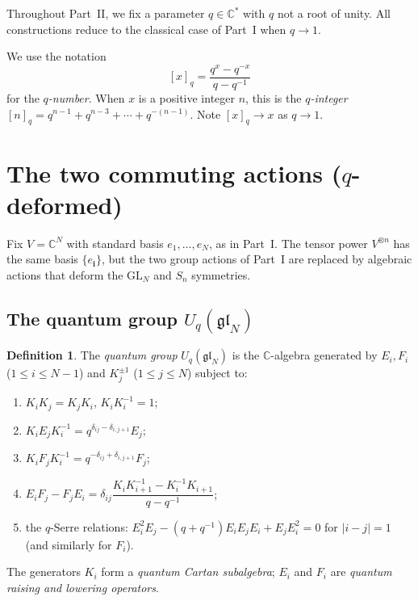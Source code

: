 \documentclass[12pt,a4paper]{article}
\theoremstyle{definition}
\newtheorem{definition}[theorem]{Definition}
\theoremstyle{remark}
\newcommand{\C}{\mathbb{C}}
\newcommand{\gl}{\mathfrak{gl}}
\begin{document}
Throughout Part~II, we fix a parameter $q \in \C^*$ with $q$ not a
root of unity. All constructions reduce to the classical case of
Part~I when $q \to 1$.

We use the notation
\[
  [x]_q = \frac{q^x - q^{-x}}{q - q^{-1}}
\]
for the \emph{$q$-number}. When $x$ is a positive integer $n$, this
is the \emph{$q$-integer} $[n]_q = q^{n-1} + q^{n-3} + \cdots +
q^{-(n-1)}$. Note $[x]_q \to x$ as $q \to 1$.

\section{The two commuting actions ($q$-deformed)}
\label{sec:q-setup}

Fix $V = \C^N$ with standard basis $e_1, \ldots, e_N$, as in Part~I.
The tensor power $V^{\otimes n}$ has the same basis $\{e_\mathbf{i}\}$,
but the two group actions of Part~I are replaced by algebraic actions
that deform the $\mathrm{GL}_N$ and $S_n$ symmetries.

\subsection{The quantum group $U_q(\gl_N)$}

\begin{definition}
The \emph{quantum group} $U_q(\gl_N)$ is the $\C$-algebra generated by
$E_i, F_i$ ($1 \leqslant i \leqslant N{-}1$) and $K_j^{\pm 1}$
($1 \leqslant j \leqslant N$) subject to:
\begin{enumerate}[label=(\roman*)]
\item $K_i K_j = K_j K_i$, \; $K_i K_i^{-1} = 1$;
\item $K_i E_j K_i^{-1} = q^{\delta_{ij} - \delta_{i,j+1}} E_j$;
\item $K_i F_j K_i^{-1} = q^{-\delta_{ij} + \delta_{i,j+1}} F_j$;
\item $E_i F_j - F_j E_i = \delta_{ij}
  \dfrac{K_i K_{i+1}^{-1} - K_i^{-1} K_{i+1}}{q - q^{-1}}$;
\item the $q$-Serre relations:
  $E_i^2 E_j - (q + q^{-1}) E_i E_j E_i + E_j E_i^2 = 0$
  for $|i - j| = 1$ (and similarly for $F_i$).
\end{enumerate}
The generators $K_i$ form a \emph{quantum Cartan subalgebra}; $E_i$
and $F_i$ are \emph{quantum raising and lowering operators}.
\end{definition}
\end{document}
